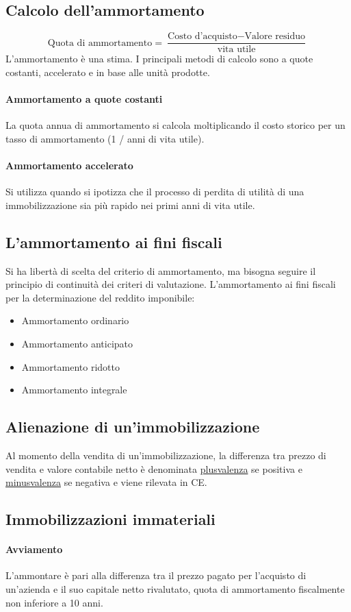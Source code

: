 \documentclass{report}
\begin{document}
	\subsection{Calcolo dell'ammortamento}
	\[\text{Quota di ammortamento} = \dfrac{\text{Costo d'acquisto} - \text{Valore residuo}}{\text{vita utile}}\]
	L'ammortamento è una stima. I principali metodi di calcolo sono a quote costanti, accelerato e in base alle unità prodotte.
	\paragraph{Ammortamento a quote costanti} La quota annua di ammortamento si calcola moltiplicando il costo storico per un tasso di ammortamento (1 / anni di vita utile).
	\paragraph{Ammortamento accelerato} Si utilizza quando si ipotizza che il processo di perdita di utilità di una immobilizzazione sia più rapido nei primi anni di vita utile.
	\subsection{L'ammortamento ai fini fiscali}
	Si ha libertà di scelta del criterio di ammortamento, ma bisogna seguire il principio di continuità dei criteri di valutazione. L'ammortamento ai fini fiscali per la determinazione del reddito imponibile:
	\begin{itemize}
		\item Ammortamento ordinario
		\item Ammortamento anticipato
		\item Ammortamento ridotto
		\item Ammortamento integrale
	\end{itemize}
	\subsection{Alienazione di un'immobilizzazione}
	Al momento della vendita di un'immobilizzazione, la differenza tra prezzo di vendita e valore contabile netto è denominata \underline{plusvalenza} se positiva e \underline{minusvalenza} se negativa e viene rilevata in CE.
	\subsection{Immobilizzazioni immateriali}
	\paragraph{Avviamento} L'ammontare è pari alla differenza tra il prezzo pagato per l'acquisto di un'azienda e il suo capitale netto rivalutato, quota di ammortamento fiscalmente non inferiore a 10 anni.
\end{document}
